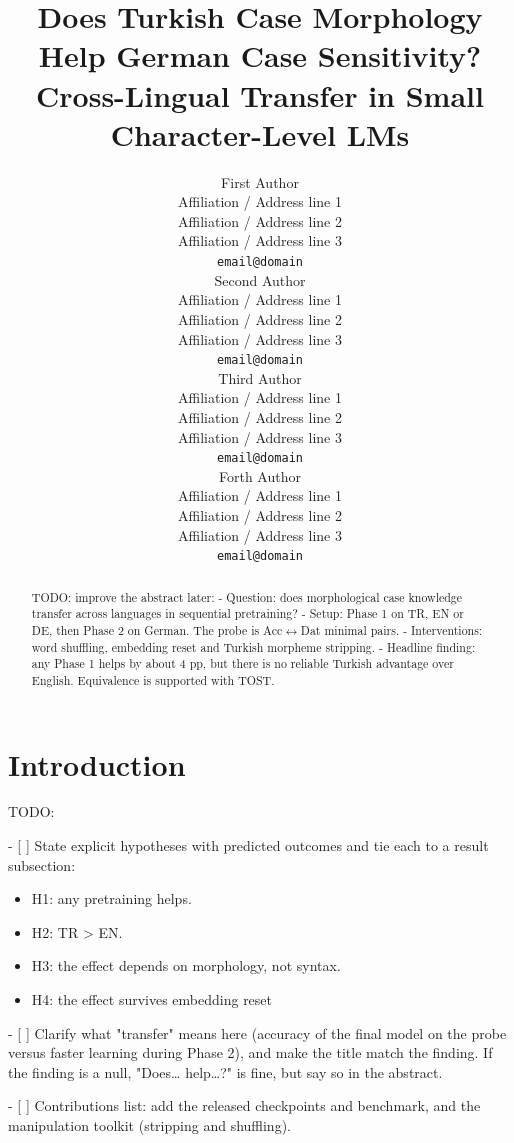\documentclass[11pt]{article}
\title{Does Turkish Case Morphology Help German Case Sensitivity? Cross-Lingual Transfer in Small Character-Level LMs}
\author{First Author \\
  Affiliation / Address line 1 \\
  Affiliation / Address line 2 \\
  Affiliation / Address line 3 \\
  \texttt{email@domain} \\\And
  Second Author \\
  Affiliation / Address line 1 \\
  Affiliation / Address line 2 \\
  Affiliation / Address line 3 \\
  \texttt{email@domain} \\\And
  Third Author \\
  Affiliation / Address line 1 \\
  Affiliation / Address line 2 \\
  Affiliation / Address line 3 \\
  \texttt{email@domain} \\\And
  Forth Author \\
  Affiliation / Address line 1 \\
  Affiliation / Address line 2 \\
  Affiliation / Address line 3 \\
  \texttt{email@domain} \\}
\begin{document}
\maketitle
\begin{abstract}

TODO: improve the abstract later:
- Question: does morphological case knowledge transfer across languages in sequential pretraining?
- Setup: Phase 1 on TR, EN or DE, then Phase 2 on German. The probe is Acc$\leftrightarrow$Dat minimal pairs.
- Interventions: word shuffling, embedding reset and Turkish morpheme stripping.
- Headline finding: any Phase 1 helps by about 4 pp, but there is no reliable Turkish advantage over English. Equivalence is supported with TOST.
\end{abstract}

\section{Introduction}

TODO:

- [ ] State explicit hypotheses with predicted outcomes and tie each to a result subsection:
\begin{itemize}
    \item H1: any pretraining helps. 
    \item H2: TR > EN. 
    \item H3: the effect depends on morphology, not syntax. 
    \item H4: the effect survives embedding reset
\end{itemize}

- [ ] Clarify what "transfer" means here (accuracy of the final model on the probe versus faster learning during Phase 2), and make the title match the finding. If the finding is a null, "Does… help…?" is fine, but say so in the abstract.

- [ ] Contributions list: add the released checkpoints and benchmark, and the manipulation toolkit (stripping and shuffling).
\end{document}
